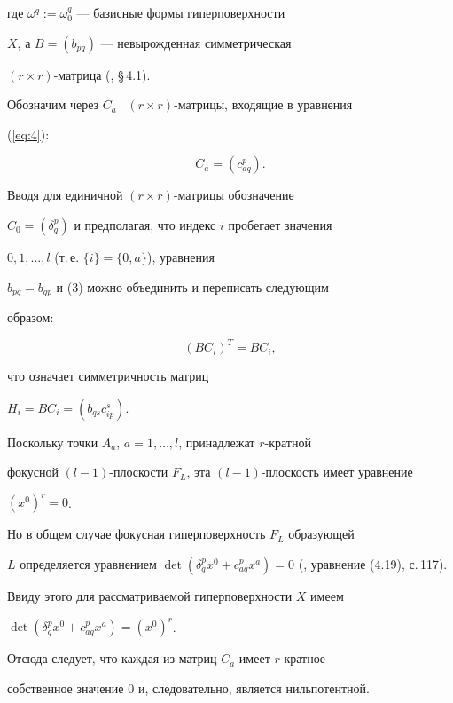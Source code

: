 где $\omega^q := \omega_0^q$ --- базисные формы гиперповерхности


$X$, а $B = (b_{pq})$ --- невырожденная симметрическая


$(r \times r)$-матрица (\cite{AG93}, \S\,4.1).





Обозначим через $C_a$ \ $(r \times r)$-матрицы, входящие в уравнения


(\ref{eq:4}):


$$


C_a = ( c^p_{aq}).


$$


Вводя для единичной $(r \times r)$-матрицы обозначение


$C_0 = (\delta^p_q)$ и предполагая, что индекс $i$ пробегает значения


$0, 1, \dotsc, l$ (т.\,е. $\{i\} = \{0, a\}$), уравнения


$b_{pq} = b_{qp}$ и (3) можно объединить и переписать следующим


образом:


\begin{equation}\label{eq:6}


(B C_i)^T = B C_i,


\end{equation}


что означает симметричность матриц


$H_i = B C_i = (b_{qs} c^s_{ip})$.





Поскольку точки $A_a$, $a = 1, \dotsc, l$, принадлежат $r$-кратной


фокусной $(l-1)$-плоскости $F_L$,  эта $(l-1)$-плоскость имеет уравнение


$(x^0)^r = 0$.


Но в общем случае фокусная гиперповерхность $F_L$ образующей


$L$ определяется уравнением  $\det (\delta_q^p


x^0 + c^p_{aq} x^a) = 0$ (\cite{AG93}, уравнение (4.19), с.\,117).


Ввиду этого для рассматриваемой гиперповерхности $X$ имеем


$\det (\delta_q^p x^0 + c^p_{aq} x^a) = (x^0)^r$.


Отсюда следует, что каждая из матриц  $C_a$ имеет $r$-кратное


собственное значение $0$ и, следовательно, является нильпотентной.


